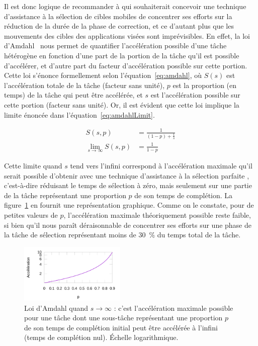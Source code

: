 	Il est donc logique de recommander à qui souhaiterait concevoir une technique d'assistance à la sélection de cibles mobiles de concentrer ses efforts sur la réduction de la durée de la phase de correction, et ce d'autant plus que les mouvements des cibles des applications visées sont imprévisibles. En effet, la loi d'Amdahl~\cite{amdahl1967validity} nous permet de quantifier l'accélération possible d'une tâche hétérogène en fonction d'une part de la portion de la tâche qu'il est possible d'accélérer, et d'autre part du facteur d'accélération possible sur cette portion. Cette loi s'énonce formellement selon l'équation~\ref{eq:amdahl}, où $S(s)$ est l'accélération totale de la tâche (facteur sans unité), $p$ est la proportion (en temps) de la tâche qui peut être accélérée, et $s$ est l'accélération possible sur cette portion (facteur sans unité). Or, il est évident que cette loi implique la limite énoncée dans l'équation~\ref{eq:amdahlLimit}.
	
	\begin{align}
		\label{eq:amdahl}
		S(s,p) &= \frac{1}{(1-p) + \frac{1}{s}} \\
		\label{eq:amdahlLimit}
		\lim_{s\to\infty} S(s,p) &= \frac{1}{1-p}
	\end{align}
	
	Cette limite quand $s$ tend vers l'infini correspond à l'accélération maximale qu'il serait possible d'obtenir avec une technique d'assistance à la sélection \og parfaite \fg{}, c'est-à-dire réduisant le temps de sélection à zéro, mais seulement sur une partie de la tâche représentant une proportion $p$ de son temps de complétion. La figure~\ref{fig:amdahl} en fournit une représentation graphique. Comme on le constate, pour de petites valeurs de $p$, l'accélération maximale théoriquement possible reste faible, si bien qu'il nous paraît déraisonnable de concentrer ses efforts sur une phase de la tâche de sélection représentant moins de 30~\%{} du temps total de la tâche.
	
	\begin{figure}
		\centering
		\includegraphics[width=0.45\textwidth]{figures/ch4/amdahl}
		\caption[Loi d'Amdahl sous sa forme de limite]{Loi d'Amdahl quand $s\to\infty$ : c'est l'accélération maximale possible pour une tâche dont une sous-tâche représentant une proportion $p$ de son temps de complétion initial peut être accélérée à l'infini (temps de complétion nul). Échelle logarithmique.}
		\label{fig:amdahl}
	\end{figure}
	
